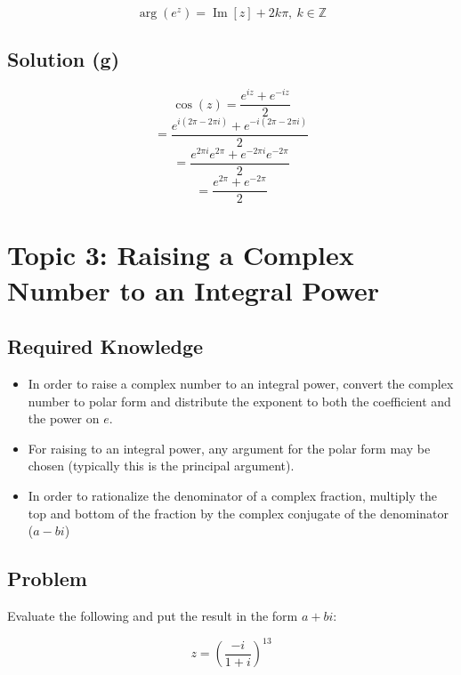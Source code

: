 \documentclass[12pt]{article}
\newcommand{\integer}{\mathbb{Z}}
\renewcommand{\Im}{\operatorname{Im}}
\begin{document}
\begin{equation}
	\arg(e^z)=\Im[z]+2k\pi,\:k\in\integer
\end{equation}
\subsection{Solution (g)}

\begin{equation}
	\cos(z)=\frac{e^{iz}+e^{-iz}}{2}
\end{equation}
\begin{equation}
	=\frac{e^{i(2\pi-2\pi i)}+e^{-i(2\pi-2\pi i)}}{2}
\end{equation}
\begin{equation}
	=\frac{e^{2\pi i}e^{2\pi}+e^{-2\pi i}e^{-2\pi}}{2}
\end{equation}
\begin{equation}
	=\frac{e^{2\pi}+e^{-2\pi}}{2}
\end{equation}
\section{Topic 3: Raising a Complex Number to an Integral Power}
\subsection{Required Knowledge}
\begin{itemize}
    \item In order to raise a complex number to an integral power, convert the complex number to polar form and distribute the exponent to both the coefficient and the power on $e$.
    \item For raising to an integral power, any argument for the polar form may be chosen (typically this is the principal argument).
    \item In order to rationalize the denominator of a complex fraction, multiply the top and bottom of the fraction by the complex conjugate of the denominator ($a-bi$)
\end{itemize}

\subsection{Problem}

Evaluate the following and put the result in the form $a+bi$:

\begin{equation}
	z=(\frac{-i}{1+i})^{13}
\end{equation}
\end{document}
